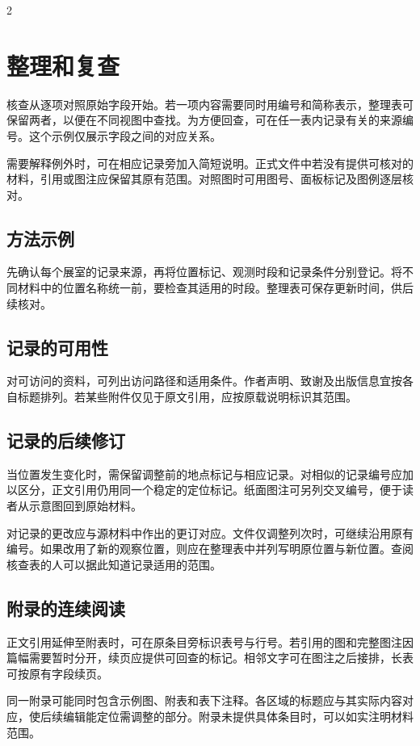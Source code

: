 \begin{multicols}{2}
\section*{整理和复查}
核查从逐项对照原始字段开始。若一项内容需要同时用编号和简称表示，整理表可保留两者，以便在不同视图中查找。为方便回查，可在任一表内记录有关的来源编号。这个示例仅展示字段之间的对应关系。

需要解释例外时，可在相应记录旁加入简短说明。正式文件中若没有提供可核对的材料，引用或图注应保留其原有范围。对照图时可用图号、面板标记及图例逐层核对。

\subsection*{方法示例}
先确认每个展室的记录来源，再将位置标记、观测时段和记录条件分别登记。将不同材料中的位置名称统一前，要检查其适用的时段。整理表可保存更新时间，供后续核对。

\subsection*{记录的可用性}
对可访问的资料，可列出访问路径和适用条件。作者声明、致谢及出版信息宜按各自标题排列。若某些附件仅见于原文引用，应按原载说明标识其范围。

\subsection*{记录的后续修订}
当位置发生变化时，需保留调整前的地点标记与相应记录。对相似的记录编号应加以区分，正文引用仍用同一个稳定的定位标记。纸面图注可另列交叉编号，便于读者从示意图回到原始材料。

对记录的更改应与源材料中作出的更订对应。文件仅调整列次时，可继续沿用原有编号。如果改用了新的观察位置，则应在整理表中并列写明原位置与新位置。查阅核查表的人可以据此知道记录适用的范围。

\subsection*{附录的连续阅读}
正文引用延伸至附表时，可在原条目旁标识表号与行号。若引用的图和完整图注因篇幅需要暂时分开，续页应提供可回查的标记。相邻文字可在图注之后接排，长表可按原有字段续页。

同一附录可能同时包含示例图、附表和表下注释。各区域的标题应与其实际内容对应，使后续编辑能定位需调整的部分。附录未提供具体条目时，可以如实注明材料范围。


\end{multicols}
